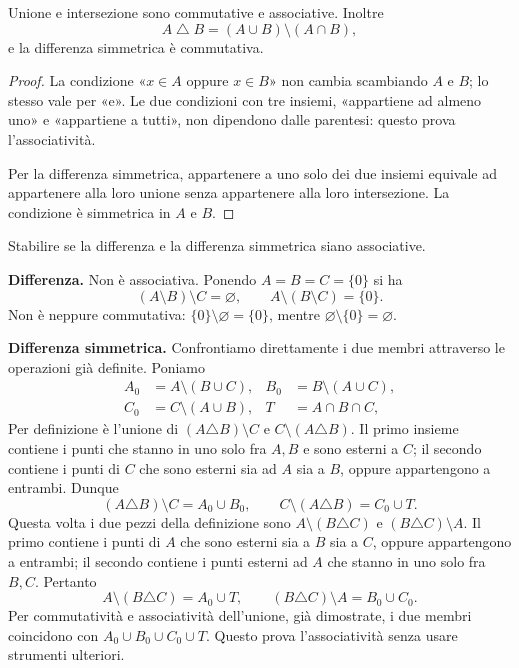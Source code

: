 \begin{proposizione}
Unione e intersezione sono commutative e associative. Inoltre
\[
A\mathbin\triangle B=(A\cup B)\setminus(A\cap B),
\]
e la differenza simmetrica è commutativa.
\end{proposizione}
\begin{proof}
La condizione «$x\in A$ oppure $x\in B$» non cambia scambiando $A$ e $B$; lo stesso vale per «e». Le due condizioni con tre insiemi, «appartiene ad almeno uno» e «appartiene a tutti», non dipendono dalle parentesi: questo prova l'associatività.

Per la differenza simmetrica, appartenere a uno solo dei due insiemi equivale ad appartenere alla loro unione senza appartenere alla loro intersezione. La condizione è simmetrica in $A$ e $B$.
\end{proof}

\begin{esercizio}
Stabilire se la differenza e la differenza simmetrica siano associative.
\end{esercizio}
\begin{svolgimento}
\textbf{Differenza.} Non è associativa. Ponendo $A=B=C=\{0\}$ si ha
\[
(A\setminus B)\setminus C=\varnothing,
\qquad A\setminus(B\setminus C)=\{0\}.
\]
Non è neppure commutativa: $\{0\}\setminus\varnothing=\{0\}$, mentre $\varnothing\setminus\{0\}=\varnothing$.

\textbf{Differenza simmetrica.} Confrontiamo direttamente i due membri attraverso le operazioni già definite. Poniamo
\[
\begin{aligned}
A_0&=A\setminus(B\cup C),& B_0&=B\setminus(A\cup C),\\
C_0&=C\setminus(A\cup B),& T&=A\cap B\cap C,
\end{aligned}
\]
 Per definizione è l'unione di $(A\triangle B)\setminus C$ e $C\setminus(A\triangle B)$. Il primo insieme contiene i punti che stanno in uno solo fra $A,B$ e sono esterni a $C$; il secondo contiene i punti di $C$ che sono esterni sia ad $A$ sia a $B$, oppure appartengono a entrambi. Dunque
\[
(A\triangle B)\setminus C=A_0\cup B_0,
\qquad C\setminus(A\triangle B)=C_0\cup T.
\]
 Questa volta i due pezzi della definizione sono $A\setminus(B\triangle C)$ e $(B\triangle C)\setminus A$. Il primo contiene i punti di $A$ che sono esterni sia a $B$ sia a $C$, oppure appartengono a entrambi; il secondo contiene i punti esterni ad $A$ che stanno in uno solo fra $B,C$. Pertanto
\[
A\setminus(B\triangle C)=A_0\cup T,
\qquad (B\triangle C)\setminus A=B_0\cup C_0.
\]
Per commutatività e associatività dell'unione, già dimostrate, i due membri coincidono con $A_0\cup B_0\cup C_0\cup T$. Questo prova l'associatività senza usare strumenti ulteriori.
\end{svolgimento}

